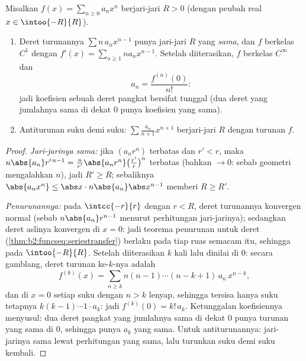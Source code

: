 \begin{theorem}\label{thm:b2:powerseries:calculus}
Misalkan $f(x) = \sum_{n\geq0} a_n x^n$ berjari-jari $R > 0$ (dengan
peubah real $x \in \intoo{-R}{R}$).
\begin{enumerate}
  \item Deret turunannya $\sum n\,a_n x^{n-1}$ punya jari-jari $R$
        yang \emph{sama}, dan $f$ berkelas $C^1$ dengan $f'(x) =
        \sum_{n \geq 1} n a_n x^{n-1}$. Setelah diiterasikan, $f$
        berkelas $C^\infty$ dan
        \[
        a_n = \frac{f^{(n)}(0)}{n!} :
        \]
        jadi koefisien sebuah deret pangkat bersifat tunggal (dua deret
        yang jumlahnya sama di dekat $0$ punya koefisien yang sama).
  \item Antiturunan suku demi suku: $\sum \frac{a_n}{n+1}x^{n+1}$
        berjari-jari $R$ dengan turunan $f$.
\end{enumerate}
\end{theorem}

\begin{proof}
\emph{Jari-jarinya sama:} jika $(a_nr^n)$ terbatas dan $r' < r$, maka
$n\abs{a_n} r'^{\,n-1} = \frac{n}{r'}\abs{a_nr^n}
\bigl(\frac{r'}{r}\bigr)^n$ terbatas (bahkan $\to 0$: sebab geometri
mengalahkan $n$), jadi $R' \geq R$; sebaliknya $\abs{a_n x^n} \leq \abs x
\cdot n\abs{a_n}\abs x^{n-1}$ memberi $R \geq R'$.

\emph{Penurunannya:} pada $\intcc{-r}{r}$ dengan $r < R$, deret
turunannya konvergen normal (sebab $n\abs{a_n}r^{n-1}$ 
menurut perhitungan jari-jarinya); sedangkan deret aslinya konvergen di
$x = 0$: jadi teorema penurunan untuk deret
(\cref{thm:b2:funcseq:seriestransfer}) berlaku pada tiap ruas semacam
itu, sehingga pada $\intoo{-R}{R}$. Setelah diiterasikan $k$ kali lalu
dinilai di $0$: secara gamblang, deret turunan ke-$k$-nya adalah
\[
f^{(k)}(x) = \sum_{n\geq k} n(n-1)\cdots(n-k+1)\,a_n\,x^{n-k},
\]
dan di $x = 0$ setiap suku dengan $n > k$ lenyap, sehingga tersisa
hanya suku tetapnya $k(k-1)\cdots1\cdot a_k$: jadi $f^{(k)}(0) =
k!\,a_k$. Ketunggalan koefisiennya menyusul: dua deret pangkat
yang jumlahnya sama di dekat $0$ punya turunan yang sama di $0$,
sehingga punya $a_k$ yang sama. Untuk antiturunannya: jari-jarinya sama
lewat perhitungan yang sama, lalu turunkan suku demi suku kembali.
\end{proof}

